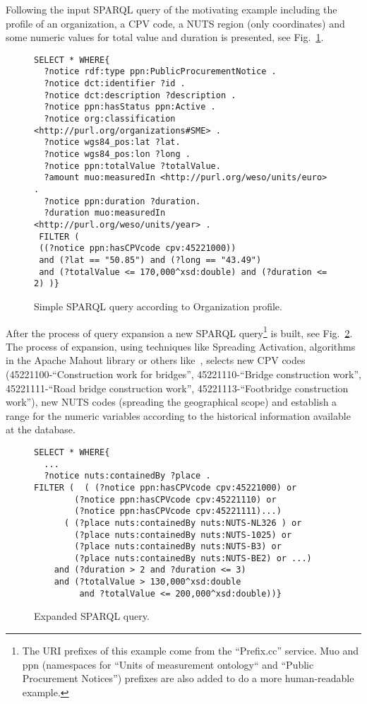 \documentclass{llncs}
\begin{document}
Following the input SPARQL query of the motivating example including the profile of an organization, a CPV code, a NUTS region 
(only coordinates) and some numeric values for total value and duration is presented, see Fig.~\ref{figure:simple}.

\begin{figure}[!h]
\begin{center}
\begin{lstlisting}[language=SPARQL]
SELECT * WHERE{
  ?notice rdf:type ppn:PublicProcurementNotice .
  ?notice dct:identifier ?id .
  ?notice dct:description ?description .
  ?notice ppn:hasStatus ppn:Active .
  ?notice org:classification <http://purl.org/organizations#SME> .
  ?notice wgs84_pos:lat ?lat.
  ?notice wgs84_pos:lon ?long .
  ?notice ppn:totalValue ?totalValue.
  ?amount muo:measuredIn <http://purl.org/weso/units/euro> .
  ?notice ppn:duration ?duration.
  ?duration muo:measuredIn <http://purl.org/weso/units/year> .
 FILTER ( 
 ((?notice ppn:hasCPVcode cpv:45221000))
 and (?lat == "50.85") and (?long == "43.49")
 and (?totalValue <= 170,000^xsd:double) and (?duration <= 2) )}
\end{lstlisting}
\caption{Simple SPARQL query according to Organization profile.}
\label{figure:simple}
\end{center}
\end{figure}

After the process of query expansion a new SPARQL query\footnote{The URI prefixes of this example come from the ``Prefix.cc'' service. 
Muo and ppn (namespaces for ``Units of measurement ontology`` and ``Public Procurement Notices'') prefixes are also added to do a more human-readable example.} is built, 
see Fig.~\ref{figure:expanded}. The process of expansion, using techniques like Spreading Activation, algorithms in the Apache Mahout library or others like~\cite{citeulike:9135863}, 
selects new CPV codes (45221100-``Construction work for bridges'', 45221110-``Bridge construction work'', 45221111-``Road bridge construction work'', 45221113-``Footbridge construction work''), 
new NUTS codes (spreading the geographical scope) and establish a range for the numeric
variables according to the historical information available at the database. 
\begin{figure}[!h] 
\begin{center}
\begin{lstlisting}[language=SPARQL]
SELECT * WHERE{
  ...
  ?notice nuts:containedBy ?place .
FILTER (  ( (?notice ppn:hasCPVcode cpv:45221000) or 
	    (?notice ppn:hasCPVcode cpv:45221110) or
	    (?notice ppn:hasCPVcode cpv:45221111)...)
	  ( (?place nuts:containedBy nuts:NUTS-NL326 ) or 
	    (?place nuts:containedBy nuts:NUTS-1025) or 
	    (?place nuts:containedBy nuts:NUTS-B3) or
	    (?place nuts:containedBy nuts:NUTS-BE2) or ...) 
	and (?duration > 2 and ?duration <= 3) 
	and (?totalValue > 130,000^xsd:double 
	     and ?totalValue <= 200,000^xsd:double))}
\end{lstlisting}
\caption{Expanded SPARQL query.}
\label{figure:expanded}
\end{center}
\end{figure}
\end{document}
